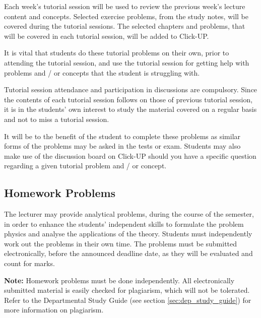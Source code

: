         Each week's tutorial session will be used to review the previous week's
        lecture content and concepts. Selected exercise problems, from the
        study notes, will be covered during the tutorial sessions. The
        selected chapters and problems, that will be covered in each tutorial
        session, will be added to Click-UP.

        It is vital that students do these tutorial problems on their own,
        prior to attending the tutorial session, and use the tutorial session
        for getting help with problems and / or concepts that the student is
        struggling with.

        Tutorial session attendance and participation in discussions are
        compulsory. Since the contents of each tutorial session follows on
        those of previous tutorial session, it is in the students’ own
        interest to study the material covered on a regular basis and not
        to miss a tutorial session.

        It will be to the benefit of the student to complete these problems as
        similar forms of the problems may be asked in the tests or exam.
        Students may also make use of the discussion board on Click-UP should
        you have a specific question regarding a given tutorial problem and /
        or concept.

    \subsection{Homework Problems}
        The lecturer may provide analytical problems, during the course of the
        semester, in order to enhance the students’ independent skills to
        formulate the problem physics and analyse the applications of the
        theory. Students must independently work out the problems in their
        own time. The problems must be submitted electronically, before the
        announced deadline date, as they will be evaluated and count for marks.

        \textbf{Note:} Homework problems must be done independently. All
        electronically submitted material is easily checked for plagiarism,
        which will not be tolerated. Refer to the Departmental Study Guide
        (see section \ref{sec:dep_study_guide}) for more information on
        plagiarism.
